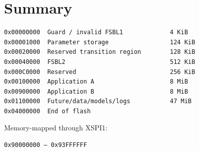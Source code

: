 \documentclass[10pt,a4paper,oneside]{report}
\begin{document}
\section{Summary}\label{wiki-reference-flash-layout-proposal--12-summary}

\begin{verbatim}
0x00000000  Guard / invalid FSBL1             4 KiB
0x00001000  Parameter storage                 124 KiB
0x00020000  Reserved transition region        128 KiB
0x00040000  FSBL2                             512 KiB
0x000C0000  Reserved                          256 KiB
0x00100000  Application A                     8 MiB
0x00900000  Application B                     8 MiB
0x01100000  Future/data/models/logs           47 MiB
0x04000000  End of flash
\end{verbatim}

Memory-mapped through XSPI1:

\begin{verbatim}
0x90000000 – 0x93FFFFFF
\end{verbatim}
\end{document}
